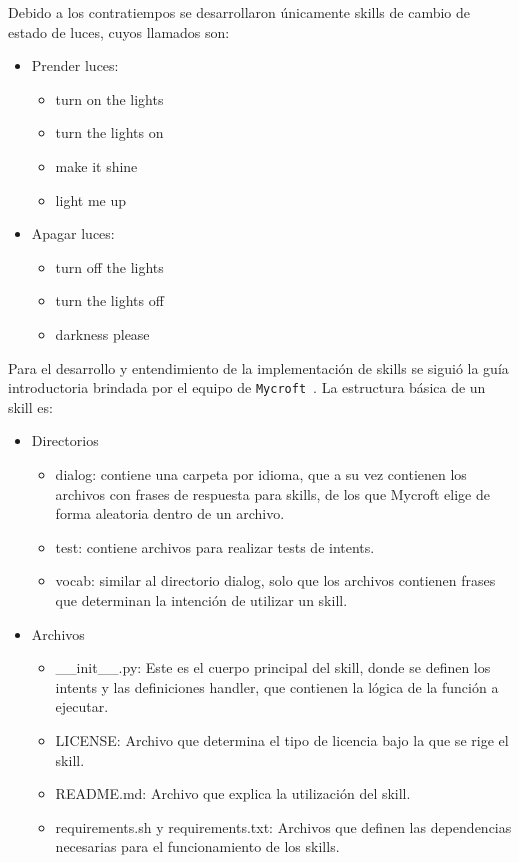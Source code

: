 Debido a los contratiempos se desarrollaron únicamente skills de cambio de estado de luces, cuyos llamados son:
\begin{itemize}
  \item Prender luces:
    \begin{itemize}
      \item turn on the lights
      \item turn the lights on
      \item make it shine
      \item light me up
    \end{itemize}
  \item Apagar luces:
    \begin{itemize}
      \item turn off the lights
      \item turn the lights off
      \item darkness please
    \end{itemize}
\end{itemize}


Para el desarrollo y entendimiento de la implementación de skills se siguió la guía introductoria brindada por el equipo de \lstinline[columns=fixed]{Mycroft}~\cite{GuiaMycroft}.
La estructura básica de un skill es:
\begin{itemize}
  \item Directorios

  \begin{itemize}
    \item dialog: contiene una carpeta por idioma, que a su vez contienen los archivos con frases de respuesta para skills, de los que Mycroft elige de forma aleatoria dentro de un archivo.
    \item test: contiene archivos para realizar tests de intents.
    \item vocab: similar al directorio dialog, solo que los archivos contienen frases que determinan la intención de utilizar un skill.
  \end{itemize}

  \item Archivos
  \begin{itemize}
    \item \_\_init\_\_.py: Este es el cuerpo principal del skill, donde se definen los intents y las definiciones handler, que contienen la lógica de la función a ejecutar.
    \item LICENSE: Archivo que determina el tipo de licencia bajo la que se rige el skill.
    \item README.md: Archivo que explica la utilización del skill.
    \item requirements.sh y requirements.txt: Archivos que definen las dependencias necesarias para el funcionamiento de los skills.

  \end{itemize}
\end{itemize}

